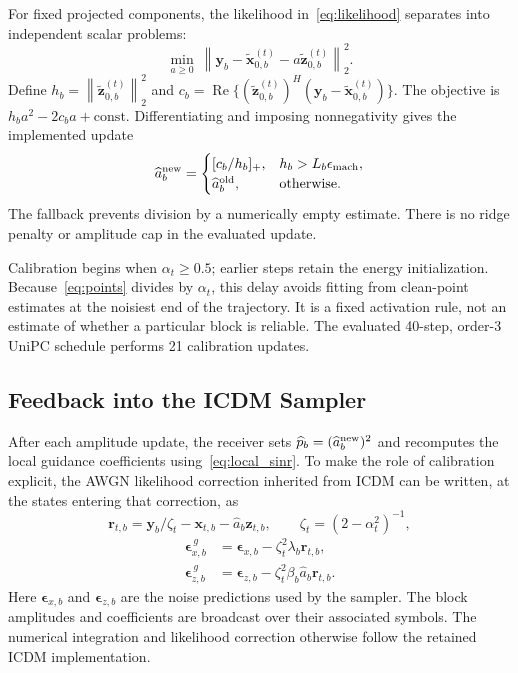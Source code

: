 \documentclass[conference]{IEEEtran}
\newcommand{\vect}[1]{\boldsymbol{#1}}
\newcommand{\norm}[1]{\left\lVert#1\right\rVert}
\begin{document}
For fixed projected components, the likelihood in~\eqref{eq:likelihood}
separates into independent scalar problems:
\begin{equation}
 \min_{a\geq0}\ 
 \norm{\vect{y}_b-\widetilde{\vect{x}}_{0,b}^{(t)}
                  -a\widetilde{\vect{z}}_{0,b}^{(t)}}_2^2.
 \label{eq:ls}
\end{equation}
Define
$h_b=\norm{\widetilde{\vect{z}}_{0,b}^{(t)}}_2^2$ and
$c_b=\operatorname{Re}\{
(\widetilde{\vect{z}}_{0,b}^{(t)})^H
(\vect{y}_b-\widetilde{\vect{x}}_{0,b}^{(t)})\}$.
The objective is $h_ba^2-2c_ba+\text{const}$.
Differentiating and imposing nonnegativity gives the implemented update
\begin{equation}
 \widehat a_b^{\rm new}=
 \begin{cases}
    [c_b/h_b]_+, & h_b>L_b\epsilon_{\rm mach},\\
    \widehat a_b^{\rm old}, & \text{otherwise}.
 \end{cases}
 \label{eq:amplitude}
\end{equation}
The fallback prevents division by a numerically empty estimate.
There is no ridge penalty or amplitude cap in the evaluated update.

Calibration begins when $\alpha_t\geq0.5$; earlier steps retain the energy
initialization. Because~\eqref{eq:points} divides by $\alpha_t$, this delay
avoids fitting from clean-point estimates at the noisiest end of the
trajectory. It is a fixed activation rule, not an estimate of whether a
particular block is reliable. The evaluated 40-step, order-3 UniPC schedule
performs 21 calibration updates.

\subsection{Feedback into the ICDM Sampler}

After each amplitude update, the receiver sets
$\widehat p_b=(\widehat a_b^{\rm new})^2$ and recomputes the local guidance
coefficients using~\eqref{eq:local_sinr}. To make the role of calibration
explicit, the AWGN likelihood correction inherited from ICDM can be
written, at the states entering that correction, as
\begin{equation}
 \vect{r}_{t,b}=\vect{y}_b/\zeta_t-\vect{x}_{t,b}
                  -\widehat a_b\vect{z}_{t,b},\qquad
 \zeta_t=(2-\alpha_t^2)^{-1},
 \label{eq:residual}
\end{equation}
\begin{equation}
\begin{split}
 \vect{\epsilon}^{\,g}_{x,b}
    &=\vect{\epsilon}_{x,b}-\zeta_t^2\lambda_b\vect{r}_{t,b},\\
 \vect{\epsilon}^{\,g}_{z,b}
    &=\vect{\epsilon}_{z,b}
        -\zeta_t^2\beta_b\widehat a_b\vect{r}_{t,b}.
\end{split}
\label{eq:guidance}
\end{equation}
Here $\vect{\epsilon}_{x,b}$ and $\vect{\epsilon}_{z,b}$ are the noise
predictions used by the sampler. The block amplitudes and coefficients
are broadcast over their associated symbols. The numerical integration
and likelihood correction otherwise follow the retained ICDM implementation.
\end{document}

